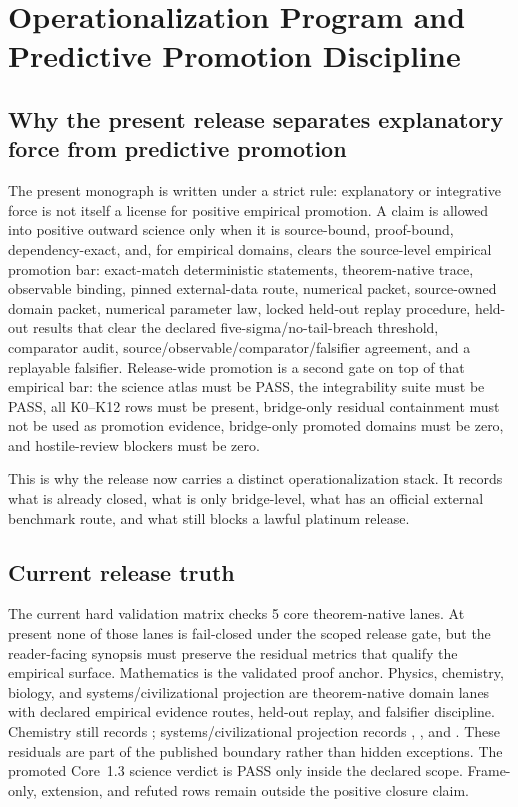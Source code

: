 \section{Operationalization Program and Predictive Promotion Discipline}
\label{sec:oc-core-1-3-operationalization-program}

\subsection{Why the present release separates explanatory force from predictive promotion}
\label{sec:oc13-prediction-claim-taxonomy-v3}
The present monograph is written under a strict rule: explanatory or integrative force is not itself a license for positive empirical promotion.
A claim is allowed into positive outward science only when it is source-bound,
proof-bound, dependency-exact, and, for empirical domains, clears the
source-level empirical promotion bar: exact-match deterministic statements,
theorem-native trace, observable binding, pinned external-data route, numerical
packet, source-owned domain packet, numerical parameter law, locked held-out
replay procedure, held-out results that clear the declared
five-sigma/no-tail-breach threshold, comparator audit,
source/observable/comparator/falsifier agreement, and a replayable falsifier.
Release-wide promotion is a second gate on top of
that empirical bar: the science atlas must be PASS, the integrability suite must
be PASS, all K0--K12 rows must be present, bridge-only residual containment must
not be used as promotion evidence, bridge-only promoted domains must be zero,
and hostile-review blockers must be zero.

This is why the release now carries a distinct operationalization stack. It records what is already closed, what is only bridge-level, what has an official external benchmark route, and what still blocks a lawful platinum release.

\subsection{Current release truth}
The current hard validation matrix checks 5 core theorem-native lanes. At
present none of those lanes is fail-closed under the scoped release gate, but
the reader-facing synopsis must preserve the residual metrics that qualify the
empirical surface. Mathematics is the validated proof anchor. Physics,
chemistry, biology, and systems/civilizational projection are theorem-native
domain lanes with declared empirical evidence routes, held-out replay, and
falsifier discipline. Chemistry still records
; systems/civilizational projection records
, , and
. These residuals are part of the
published boundary rather than hidden exceptions. The promoted Core~1.3 science
verdict is PASS only inside the declared 
scope. Frame-only, extension, and refuted rows remain outside the positive
closure claim.

